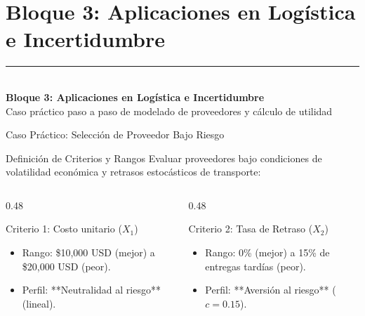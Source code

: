 \documentclass[aspectratio=169, 10pt]{beamer}
\begin{document}
\section{Bloque 3: Aplicaciones en Logística e Incertidumbre}
\begingroup
{}
\begin{frame}[plain]
    \vfill
    \hspace{0.08\paperwidth}%
    {\color{UANLgold}\rule{4cm}{2pt}}\\[8pt]%
    \hspace{0.08\paperwidth}%
    {\color{FIMEwhite}\LARGE\rmfamily\bfseries Bloque 3: Aplicaciones en Logística e Incertidumbre}\\[6pt]
    \hspace{0.08\paperwidth}%
    {\color{FIMEwhite!85}\large\sffamily Caso práctico paso a paso de modelado de proveedores y cálculo de utilidad}
    \vfill
\end{frame}
\endgroup

\begin{frame}{Caso Práctico: Selección de Proveedor Bajo Riesgo}
    \begin{block}{Definición de Criterios y Rangos}
        Evaluar proveedores bajo condiciones de volatilidad económica y retrasos estocásticos de transporte:
    \end{block}
    \begin{columns}[T]
        \begin{column}{0.48\textwidth}
            \begin{exampleblock}{Criterio 1: Costo unitario ($X_1$)}
                \begin{itemize}
                    \item Rango: \$10,000 USD (mejor) a \$20,000 USD (peor).
                    \item Perfil: **Neutralidad al riesgo** (lineal).
                \end{itemize}
            \end{exampleblock}
        \end{column}
        
        \begin{column}{0.48\textwidth}
            \begin{exampleblock}{Criterio 2: Tasa de Retraso ($X_2$)}
                \begin{itemize}
                    \item Rango: 0\% (mejor) a 15\% de entregas tardías (peor).
                    \item Perfil: **Aversión al riesgo** ($c = 0.15$).
                \end{itemize}
            \end{exampleblock}
        \end{column}
    \end{columns}
\end{frame}
\end{document}
